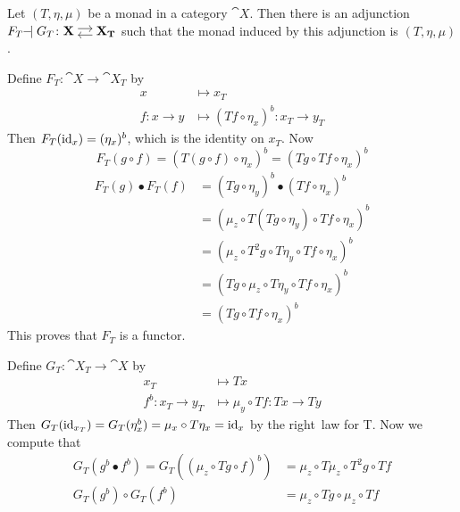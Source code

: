 \begin{theorem}
    Let $(T,\eta,\mu)$ be a monad in a category $\cat{X}$.
    Then there is an adjunction $F_T \! \! \adj G_T \colon \adjar{X}{X_T}$
    such that the monad induced by this adjunction is $(T,\eta,\mu)$.
\end{theorem}
\begin{beweis}
    \begin{itemize1}
    \item Define $F_T \colon \cat{X} \to \cat{X_T}$ by 
    \begin{align*}
        x &\mapsto x_T \\
        f \colon x \to y &\mapsto (Tf \circ \eta_x)^b \colon x_T \to y_T
    \end{align*}
    Then $F_T(\operatorname{id}_x) = (\eta_x)^b$, which is the identity on $x_T$. Now
    \[
        F_T(g \circ f) = (T(g \circ f) \circ \eta_x)^b = (Tg \circ Tf \circ \eta_x)^b
    \]
    \begin{align*}
        F_T(g) \bullet F_T(f) &= (Tg \circ \eta_y)^b \bullet (Tf \circ \eta_x)^b 
        \tag{Definition of $F^T$}\\
        &= (\mu_z \circ T(Tg \circ \eta_y) \circ Tf \circ \eta_x)^b 
        \tag{Definition of Kleisli composition}\\
        &= (\mu_z \circ T^2g \circ T\eta_y \circ Tf \circ \eta_x)^b 
        \tag{Functoriality of T}\\
        &= (Tg \circ \mu_z \circ T\eta_y \circ Tf \circ \eta_x)^b 
        \tag{Naturality of $\mu$}\\
        &= (Tg \circ Tf \circ \eta_x)^b \tag{right~\refunitality law for $T$}
    \end{align*}
    This proves that $F_T$ is a functor.
    \item Define $G_T \colon \cat{X_T} \to \cat{X}$ by
    \begin{align*}
        x_T &\mapsto Tx \\
        f^b \colon x_T \to y_T &\mapsto \mu_y \circ Tf \colon Tx \to Ty
    \end{align*}
    Then $G_T(\operatorname{id}_{x_T}) = G_T(\eta_x^b) = \mu_x \circ T\eta_x = \operatorname{id}_x$ by the right~ law for T.
    Now we compute that
    \begin{align*}
        G_T(g^b \bullet f^b) = G_T((\mu_z \circ Tg \circ f)^b) &=
        \mu_z \circ T \mu_z \circ T^2g \circ Tf \\
        G_T(g^b) \circ G_T(f^b) &= \mu_z \circ Tg \circ \mu_z \circ Tf 
    \end{align*}

\end{itemize1}
\end{beweis}
